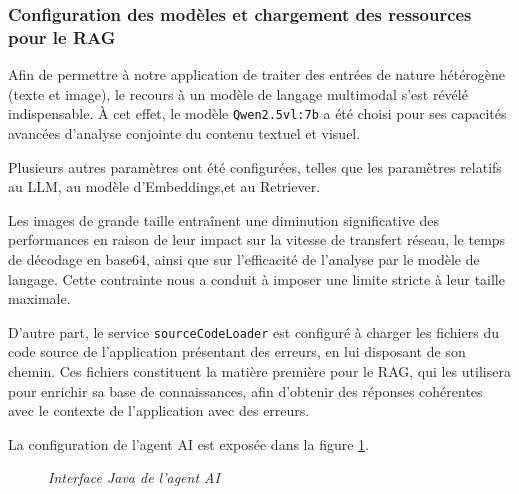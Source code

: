 \documentclass[12pt,a4paper]{report}
\begin{document}
	\subsubsection{Configuration des modèles et chargement des ressources pour le RAG}
	
	Afin de permettre à notre application de traiter des entrées de nature hétérogène (texte et image), le recours à un modèle de langage multimodal s’est révélé indispensable. À cet effet, le modèle \verb|Qwen2.5vl:7b| a été choisi pour ses capacités avancées d’analyse conjointe du contenu textuel et visuel.
	
	Plusieurs autres paramètres ont été configurées, telles que les paramètres relatifs au LLM, au modèle d'Embeddings,et au Retriever.
	
	Les images de grande taille entraînent une diminution significative des performances en raison de leur impact sur la vitesse de transfert réseau, le temps de décodage en base64, ainsi que sur l'efficacité de l'analyse par le modèle de langage. Cette contrainte nous a conduit à imposer une limite stricte à leur taille maximale.
	
	D'autre part, le service \verb|sourceCodeLoader| est configuré à charger les fichiers du code source de l'application présentant des erreurs, en lui disposant de son chemin. Ces fichiers constituent la matière première pour le RAG, qui les utilisera pour enrichir sa base de connaissances, afin d'obtenir des réponses cohérentes avec le contexte de l'application avec des erreurs.
	
	La configuration de l'agent AI est exposée dans la figure \ref{fig:ai-agent}.
	
		\begin{figure}[H]
		\centering
		\caption{\textit{Interface Java de l'agent AI}}
		\label{fig:ai-agent}
	\end{figure}
	
\end{document}
